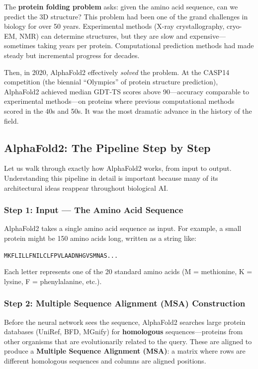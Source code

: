 The \textbf{protein folding problem} asks: given the amino acid sequence, can we predict the 3D structure? This problem had been one of the grand challenges in biology for over 50 years. Experimental methods (X-ray crystallography, cryo-EM, NMR) can determine structures, but they are slow and expensive---sometimes taking years per protein. Computational prediction methods had made steady but incremental progress for decades.

Then, in 2020, AlphaFold2 \citep{jumper2021} effectively \emph{solved} the problem. At the CASP14 competition (the biennial ``Olympics'' of protein structure prediction), AlphaFold2 achieved median GDT-TS scores above 90---accuracy comparable to experimental methods---on proteins where previous computational methods scored in the 40s and 50s. It was the most dramatic advance in the history of the field.

\subsection{AlphaFold2: The Pipeline Step by Step}

Let us walk through exactly how AlphaFold2 works, from input to output. Understanding this pipeline in detail is important because many of its architectural ideas reappear throughout biological AI.

\subsubsection{Step 1: Input --- The Amino Acid Sequence}

AlphaFold2 takes a single amino acid sequence as input. For example, a small protein might be 150 amino acids long, written as a string like:
\begin{center}
\texttt{MKFLILLFNILCLFPVLAADNHGVSMNAS...}
\end{center}
Each letter represents one of the 20 standard amino acids (M = methionine, K = lysine, F = phenylalanine, etc.).

\subsubsection{Step 2: Multiple Sequence Alignment (MSA) Construction}

Before the neural network sees the sequence, AlphaFold2 searches large protein databases (UniRef, BFD, MGnify) for \textbf{homologous} sequences---proteins from other organisms that are evolutionarily related to the query. These are aligned to produce a \textbf{Multiple Sequence Alignment (MSA)}: a matrix where rows are different homologous sequences and columns are aligned positions.


